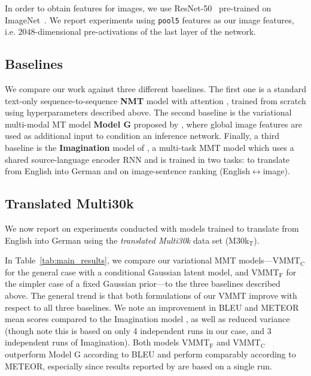 \documentclass[11pt,a4paper]{article}
\newcommand{\cond}{VMMT$_{\text{C}}$\xspace}
\newcommand{\uncond}{VMMT$_{\text{F}}$\xspace}
\begin{document}
In order to obtain features for images, we use ResNet-50~\citep{He2015} pre-trained on ImageNet~\citep{ILSVRC15}.
We report experiments using
\texttt{pool5} features as our image features, i.e. $2048$-dimensional pre-activations of the last layer of the network.


\subsection{Baselines}\label{sec:baselines}
We compare our work against three different baselines.
The first one is a standard text-only sequence-to-sequence \textbf{NMT} model with attention 
\citep{Luongetal2015}, trained from scratch using hyperparameters described above.
The second baseline is the variational multi-modal MT model \textbf{Model G} proposed by \citet{Toyamaetal2016}, where global image features are used as additional input to condition an inference network.
Finally, a third baseline is the \textbf{Imagination} model of \citet{ElliottKadar2017}, a multi-task MMT model which uses a shared source-language encoder RNN and is trained in two tasks: to translate from English into German and on image-sentence ranking (English$\leftrightarrow$image).



\subsection{Translated Multi30k}
\label{sec:translated}

We now report on experiments conducted with models trained to translate from English into German using the \emph{translated Multi30k} data set (M30k$_\text{T}$).

In Table~\ref{tab:main_results}, we compare our variational MMT models---\cond for the general case with a conditional Gaussian latent model, and \uncond for the simpler case of a fixed Gaussian prior---to the three baselines described above.
The general trend is that both formulations of our VMMT improve with respect to all three baselines.
We note an improvement in BLEU and METEOR mean scores compared to the Imagination model \citep{ElliottKadar2017}, as well as reduced variance (though note this is based on only 4 independent runs in our case, and 3 independent runs of Imagination).
Both models \uncond and \cond outperform Model G according to BLEU and perform comparably according to METEOR, especially since results reported by \citep{Toyamaetal2016} are based on a single run.
\end{document}
